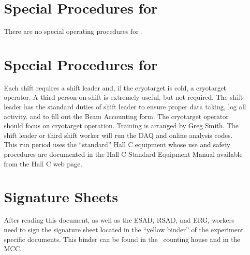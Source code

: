 %
\newpage
\section{Special Procedures for \HALL}

There are no special operating procedures for \HALL{}.

%
\newpage
\section{Special Procedures for \EXPTS}

Each shift requires a shift leader and, if the cryotarget is cold, a cryotarget 
operator.  A third person on shift is extremely useful, but not required. The shift leader 
has the standard
duties of shift leader to ensure proper data taking, log all activity, and to fill out
the Beam Accounting form. The cryotarget operator should focus on cryotarget
operation. Training is arranged by Greg Smith. The shift leader or third
shift worker will run the DAQ and online analysis codes.
This run period uses the ``standard'' Hall C equipment whose
use and safety procedures are documented in the Hall C Standard Equipment
Manual available from the Hall C web page.


\newpage
\section{Signature Sheets}

After reading this document, as well as the ESAD, RSAD, and ERG, workers need to sign
the signature sheet located in the ``yellow binder'' of the experiment specific documents.
This binder can be found in the \HALL\ counting house and in the MCC.


